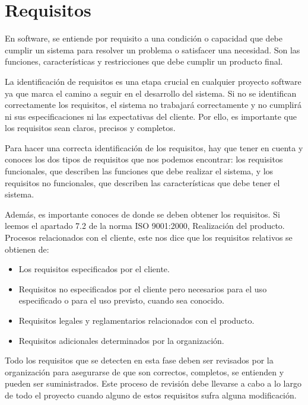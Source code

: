 \section{Requisitos}
\label{sec:analisis_requisitos}

En software, se entiende por requisito a una condición o capacidad que debe cumplir un sistema para
resolver un problema o satisfacer una necesidad. Son las funciones, características y restricciones que
debe cumplir un producto final.

La identificación de requisitos es una etapa crucial en cualquier proyecto software ya que marca el
camino a seguir en el desarrollo del sistema. Si no se identifican correctamente los requisitos, el
sistema no trabajará correctamente y no cumplirá ni sus especificaciones ni las expectativas del
cliente. Por ello, es importante que los requisitos sean claros, precisos y completos. 

Para hacer una correcta identificación de los requisitos, hay que tener en cuenta y conoces los 
dos tipos de requisitos que nos podemos encontrar: los requisitos funcionales, que describen las
funciones que debe realizar el sistema, y los requisitos no funcionales, que describen las
características que debe tener el sistema. 

Además, es importante conoces de donde se deben obtener los requisitos. Si leemos el apartado 
7.2 de la norma ISO 9001:2000, Realización del producto. Procesos relacionados con el cliente, 
este nos dice que los requisitos relativos se obtienen de: 

\begin{itemize}
    \item Los requisitos especificados por el cliente.
    \item Requisitos no especificados por el cliente pero necesarios para el uso especificado o
    para el uso previsto, cuando sea conocido.
    \item Requisitos legales y reglamentarios relacionados con el producto.
    \item Requisitos adicionales determinados por la organización.
\end{itemize}

Todo los requisitos que se detecten en esta fase deben ser revisados por la organización para 
asegurarse de que son correctos, completos, se entienden y pueden ser suministrados. Este proceso
de revisión debe llevarse a cabo a lo largo de todo el proyecto cuando alguno de estos requisitos
sufra alguna modificación.

